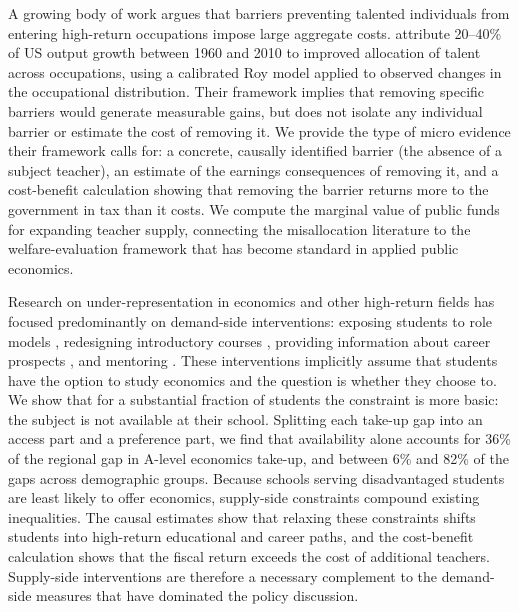A growing body of work argues that barriers preventing talented individuals from entering high-return occupations impose large aggregate costs. \citet{hsieh2019allocation} attribute 20--40\% of US output growth between 1960 and 2010 to improved allocation of talent across occupations, using a calibrated Roy model applied to observed changes in the occupational distribution. Their framework implies that removing specific barriers would generate measurable gains, but does not isolate any individual barrier or estimate the cost of removing it. We provide the type of micro evidence their framework calls for: a concrete, causally identified barrier (the absence of a subject teacher), an estimate of the earnings consequences of removing it, and a cost-benefit calculation showing that removing the barrier returns more to the government in tax than it costs. We compute the marginal value of public funds \citep{hendren2020mvpf} for expanding teacher supply, connecting the misallocation literature to the welfare-evaluation framework that has become standard in applied public economics.

Research on under-representation in economics and other high-return fields has focused predominantly on demand-side interventions: exposing students to role models \citep{porter2020rolemodel}, redesigning introductory courses \citep{bayer2020you}, providing information about career prospects \citep{avilova2018can}, and mentoring \citep{blau2010can}. These interventions implicitly assume that students have the option to study economics and the question is whether they choose to. We show that for a substantial fraction of students the constraint is more basic: the subject is not available at their school. Splitting each take-up gap into an access part and a preference part, we find that availability alone accounts for 36\% of the regional gap in A-level economics take-up, and between 6\% and 82\% of the gaps across demographic groups. Because schools serving disadvantaged students are least likely to offer economics, supply-side constraints compound existing inequalities. The causal estimates show that relaxing these constraints shifts students into high-return educational and career paths, and the cost-benefit calculation shows that the fiscal return exceeds the cost of additional teachers. Supply-side interventions are therefore a necessary complement to the demand-side measures that have dominated the policy discussion.

